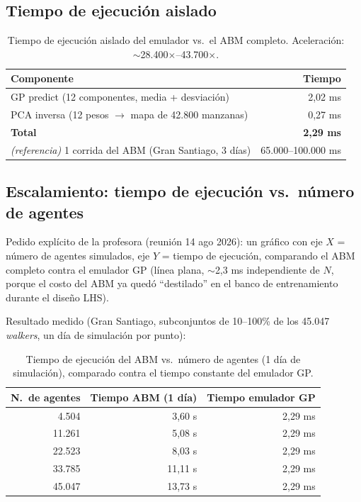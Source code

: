 \documentclass[11pt,a4paper]{article}
\begin{document}
\subsection{Tiempo de ejecución aislado}

\begin{table}[h]
\centering
\begin{tabular}{lr}
\toprule
Componente & Tiempo \\
\midrule
GP predict (12 componentes, media + desviación) & 2,02 ms \\
PCA inversa (12 pesos $\to$ mapa de 42.800 manzanas) & 0,27 ms \\
\textbf{Total} & \textbf{2,29 ms} \\
\midrule
\emph{(referencia)} 1 corrida del ABM (Gran Santiago, 3 días) & 65.000--100.000 ms \\
\bottomrule
\end{tabular}
\caption{Tiempo de ejecución aislado del emulador vs.\ el ABM completo.
Aceleración: $\sim$28.400$\times$--43.700$\times$.}
\label{tab:tiempos}
\end{table}

\subsection{Escalamiento: tiempo de ejecución vs.\ número de agentes}

Pedido explícito de la profesora (reunión 14 ago 2026): un gráfico con eje
$X$ = número de agentes simulados, eje $Y$ = tiempo de ejecución, comparando
el ABM completo contra el emulador GP (línea plana, $\sim$2,3 ms
independiente de $N$, porque el costo del ABM ya quedó ``destilado'' en el
banco de entrenamiento durante el diseño LHS).

Resultado medido (Gran Santiago, subconjuntos de 10--100\% de los 45.047
\emph{walkers}, un día de simulación por punto):

\begin{table}[h]
\centering
\begin{tabular}{rrr}
\toprule
N.\ de agentes & Tiempo ABM (1 día) & Tiempo emulador GP \\
\midrule
4.504 & 3,60 s & 2,29 ms \\
11.261 & 5,08 s & 2,29 ms \\
22.523 & 8,03 s & 2,29 ms \\
33.785 & 11,11 s & 2,29 ms \\
45.047 & 13,73 s & 2,29 ms \\
\bottomrule
\end{tabular}
\caption{Tiempo de ejecución del ABM vs.\ número de agentes (1 día de
simulación), comparado contra el tiempo constante del emulador GP.}
\label{tab:tiempo_vs_agentes}
\end{table}
\end{document}

